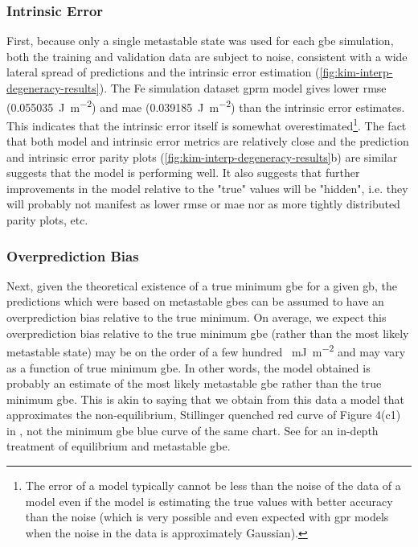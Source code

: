 \documentclass[final,twocolumn,12pt]{elsarticle}
\begin{document}
    \subsubsection{Intrinsic Error} \label{sec:discuss:lit:error}
	First, because only a single metastable state was used for each \gls{gbe} simulation, both the training and validation data are subject to noise, consistent with a wide lateral spread of predictions and the intrinsic error estimation (\cref{fig:kim-interp-degeneracy-results}). The Fe simulation dataset \gls{gprm} model gives lower \gls{rmse} (\SI{0.055035}{\joule\per\square\meter}) and \gls{mae} (\SI{0.039185}{\joule\per\square\meter}) than the intrinsic error estimates. This indicates that the intrinsic error itself is somewhat overestimated\footnote{The \outpt{} error of a model typically cannot be less than the noise of the \outpt{} data of a model even if the model is estimating the true \outpt{} values with better accuracy than the noise (which is very possible and even expected with \gls{gpr} models when the noise in the \inpt{} data is approximately Gaussian).}. The fact that both model and intrinsic error metrics are relatively close and the prediction \cite{REF} and intrinsic error parity plots (\cref{fig:kim-interp-degeneracy-results}b) are similar suggests that the model is performing well. It also suggests that further improvements in the model relative to the "true" values will be "hidden", i.e. they will probably not manifest as lower \gls{rmse} or \gls{mae} nor as more tightly distributed parity plots, etc.
	
	\subsubsection{Overprediction Bias} \label{sec:discuss:lit:overprediction}
	Next, given the theoretical existence of a true minimum \gls{gbe} for a given \gls{gb}, the predictions which were based on metastable \glspl{gbe} can be assumed to have an overprediction bias relative to the true minimum. On average, we expect this overprediction bias relative to the true minimum \gls{gbe} (rather than the most likely metastable state) may be on the order of a few hundred \SI{}{\milli\J\per\square\m} and may vary as a function of true minimum \gls{gbe}. In other words, the model obtained is probably an estimate of the most likely metastable \gls{gbe} rather than the true minimum \gls{gbe}. This is akin to saying that we obtain from this data a model that approximates the non-equilibrium, Stillinger quenched red curve of Figure 4(c1) in \cite{hanGrainboundaryMetastabilityIts2016}, not the minimum \gls{gbe} blue curve of the same chart. See \cite{hanGrainboundaryMetastabilityIts2016} for an in-depth treatment of equilibrium and metastable \gls{gbe}.
	
\end{document}
